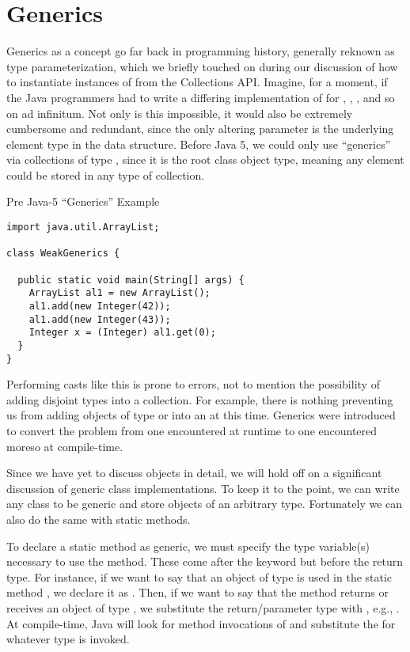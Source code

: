 \section{Generics}

Generics as a concept go far back in programming history, generally reknown as type parameterization, which we briefly touched on during our discussion of how to instantiate instances of  from the Collections API. Imagine, for a moment, if the Java programmers had to write a differing implementation of  for , , , and so on ad infinitum. Not only is this impossible, it would also be extremely cumbersome and redundant, since the only altering parameter is the underlying element type in the data structure. Before Java 5, we could only use ``generics'' via collections of type , since it is the root class object type, meaning any element could be stored in any type of collection.

\begin{cl}{Pre Java-5 ``Generics'' Example}
\begin{lstlisting}[language=MyJava]
import java.util.ArrayList;

class WeakGenerics {

  public static void main(String[] args) {
    ArrayList al1 = new ArrayList();
    al1.add(new Integer(42));
    al1.add(new Integer(43));
    Integer x = (Integer) al1.get(0);
  }
}
\end{lstlisting}
\end{cl}

Performing casts like this is prone to errors, not to mention the possibility of adding disjoint types into a collection. For example, there is nothing preventing us from adding objects of type  or  into an  at this time. Generics were introduced to convert the problem from one encountered at runtime to one encountered moreso at compile-time. 

Since we have yet to discuss objects in detail, we will hold off on a significant discussion of generic class implementations. To keep it to the point, we can write any class to be generic and store objects of an arbitrary type. Fortunately we can also do the same with static methods. 

To declare a static method as generic, we must specify the type variable(s) necessary to use the method. These come after the  keyword but before the return type. For instance, if we want to say that an object of type  is used in the static method , we declare it as . Then, if we want to say that the method returns or receives an object of type , we substitute the return/parameter type with , e.g., . At compile-time, Java will look for method invocations of  and substitute the  for whatever type  is invoked. 

